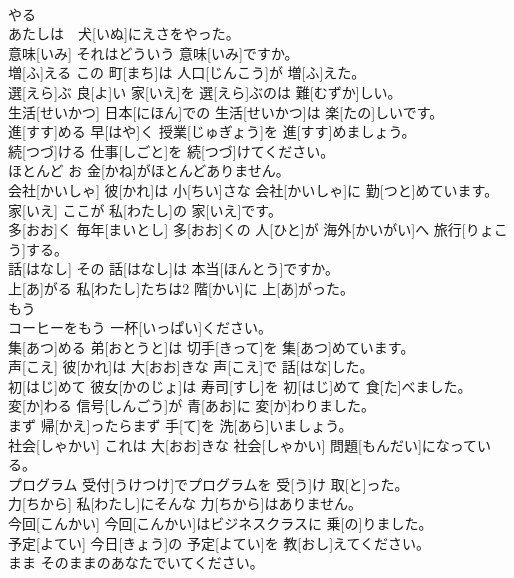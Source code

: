 \documentclass[8pt]{extreport}
\begin{document}
\begin{CJK}{UTF8}{min}
\\	やる
\\	あたしは　犬[いぬ]にえさをやった。		
\\	意味[いみ]	それはどういう 意味[いみ]ですか。		
\\	増[ふ]える	この 町[まち]は 人口[じんこう]が 増[ふ]えた。		
\\	選[えら]ぶ	良[よ]い 家[いえ]を 選[えら]ぶのは 難[むずか]しい。		
\\	生活[せいかつ]	日本[にほん]での 生活[せいかつ]は 楽[たの]しいです。		
\\	進[すす]める	早[はや]く 授業[じゅぎょう]を 進[すす]めましょう。		
\\	続[つづ]ける	仕事[しごと]を 続[つづ]けてください。		
\\	ほとんど	お 金[かね]がほとんどありません。		
\\	会社[かいしゃ]	彼[かれ]は 小[ちい]さな 会社[かいしゃ]に 勤[つと]めています。		
\\	家[いえ]	ここが 私[わたし]の 家[いえ]です。		
\\	多[おお]く	毎年[まいとし] 多[おお]くの 人[ひと]が 海外[かいがい]へ 旅行[りょこう]する。		
\\	話[はなし]	その 話[はなし]は 本当[ほんとう]ですか。		
\\	上[あ]がる	私[わたし]たちは2 階[かい]に 上[あ]がった。		
\\	もう
\\	コーヒーをもう 一杯[いっぱい]ください。		
\\	集[あつ]める	弟[おとうと]は 切手[きって]を 集[あつ]めています。		
\\	声[こえ]	彼[かれ]は 大[おお]きな 声[こえ]で 話[はな]した。		
\\	初[はじ]めて	彼女[かのじょ]は 寿司[すし]を 初[はじ]めて 食[た]べました。		
\\	変[か]わる	信号[しんごう]が 青[あお]に 変[か]わりました。		
\\	まず	帰[かえ]ったらまず 手[て]を 洗[あら]いましょう。		
\\	社会[しゃかい]	これは 大[おお]きな 社会[しゃかい] 問題[もんだい]になっている。		
\\	プログラム	受付[うけつけ]でプログラムを 受[う]け 取[と]った。		
\\	力[ちから]	私[わたし]にそんな 力[ちから]はありません。		
\\	今回[こんかい]	今回[こんかい]はビジネスクラスに 乗[の]りました。		
\\	予定[よてい]	今日[きょう]の 予定[よてい]を 教[おし]えてください。		
\\	まま	そのままのあなたでいてください。		

\end{CJK}
\end{document}

